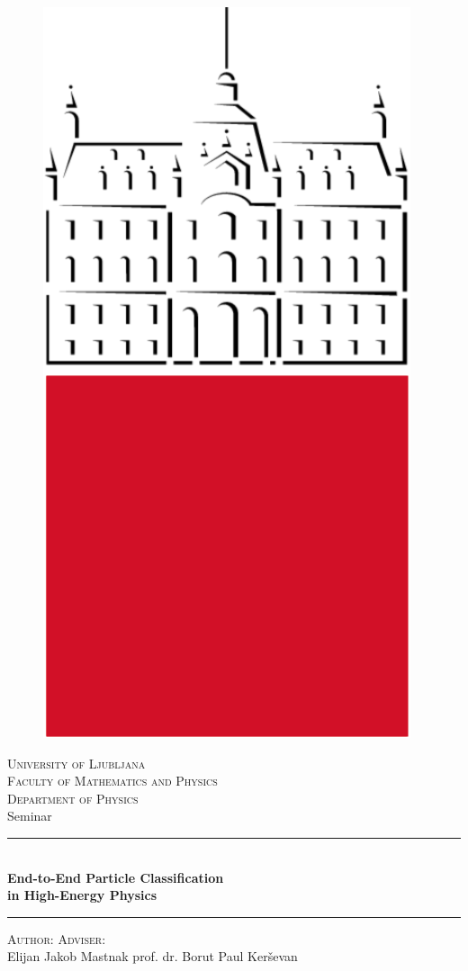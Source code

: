 \documentclass[11pt, a4paper]{article}
\begin{document}
\thispagestyle{empty}
\begin{center}

    \begin{figure}[htb!]
        \centering
        \includegraphics[width=0.1\linewidth]{raster/ul-logo}
    \end{figure}
    \huge{\textsc{University of Ljubljana}}\\
    \LARGE{\textsc{Faculty of {\color{ul-red} Mathematics and Physics}}}\\[1mm]
    \Large{\textsc{Department of Physics}}\\
    \vspace{5mm}
    \huge{Seminar}\\
    \vspace{5mm}
    \rule{\textwidth}{0.2pt}\\[3mm]
    \LARGE{\textbf{End-to-End Particle Classification\\in High-Energy Physics}}
    \rule{\textwidth}{0.2pt}

    \vspace{5mm}

    \begin{minipage}[t]{0.90\textwidth}
        \normalsize{\textsc{Author:}} \hfill \large{\textsc{Adviser}:}\\
    \large{Elijan Jakob Mastnak} \hfill \large{prof. dr. Borut Paul Ker\v{s}evan}
    \end{minipage}

\end{center}
\end{document}
